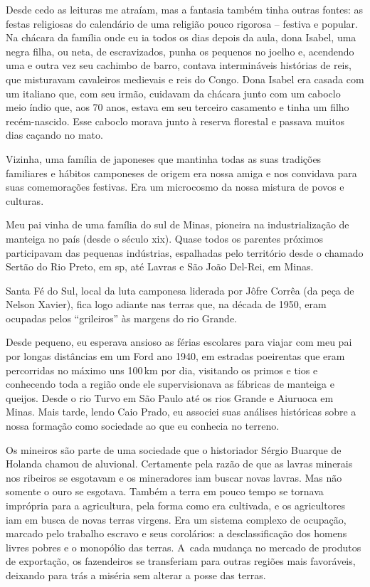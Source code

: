 {Desde cedo as leituras me atraíam, mas a fantasia também tinha outras
fontes: as festas religiosas do calendário de uma religião pouco
rigorosa -- festiva e popular. Na chácara da família onde eu ia todos os
dias depois da aula, dona Isabel, uma negra filha, ou neta, de escravizados,
punha os pequenos no joelho e, acendendo uma e outra vez seu cachimbo de
barro, contava intermináveis histórias de reis, que misturavam
cavaleiros medievais e reis do Congo. Dona Isabel era casada com um
italiano que, com seu irmão, cuidavam da chácara junto com um caboclo meio
índio que, aos 70 anos, estava em seu terceiro casamento e tinha um filho
recém-nascido. Esse caboclo morava junto à reserva florestal e passava
muitos dias caçando no mato.

Vizinha, uma família de japoneses que mantinha todas as suas tradições
familiares e hábitos camponeses de origem era nossa amiga e nos
convidava para suas comemorações festivas. Era um microcosmo da nossa
mistura de povos e culturas.

Meu pai vinha de uma família do sul de Minas, pioneira na
industrialização de manteiga no país (desde o século {\sc xix}). Quase todos
os parentes próximos participavam das pequenas indústrias,
espalhadas pelo território desde o chamado Sertão do Rio Preto, em {\sc sp}, até
Lavras e São João Del-Rei, em Minas.

Santa Fé do Sul, local da luta camponesa liderada por Jôfre Corrêa (da
peça de Nelson Xavier), fica logo adiante nas terras que, na década de
1950, eram ocupadas pelos “grileiros” às margens do rio Grande.

Desde pequeno, eu esperava ansioso as férias escolares para viajar com
meu pai por longas distâncias em um Ford ano 1940, em estradas poeirentas
que eram percorridas no máximo uns 100\,km por dia, visitando os primos e
tios e conhecendo toda a região onde ele supervisionava as fábricas de
manteiga e queijos. Desde o rio Turvo em São Paulo até os rios Grande e
Aiuruoca em Minas. Mais tarde, lendo Caio Prado, eu associei suas análises
históricas sobre a nossa formação como sociedade ao que eu conhecia no
terreno.

Os mineiros são parte de uma sociedade que o historiador Sérgio Buarque
de Holanda chamou de aluvional. Certamente pela razão de que as lavras
minerais nos ribeiros se esgotavam e os mineradores iam buscar novas
lavras. Mas não somente o ouro se esgotava. Também a terra em pouco
tempo se tornava imprópria para a agricultura, pela forma como era
cultivada, e os agricultores iam em busca de novas terras virgens. Era um
sistema complexo de ocupação, marcado pelo trabalho escravo e seus
corolários: a desclassificação dos homens livres pobres e o monopólio das
terras. A~cada mudança no mercado de produtos de exportação, os
fazendeiros se transferiam para outras regiões mais favoráveis, deixando
para trás a miséria sem alterar a posse das terras.

}
